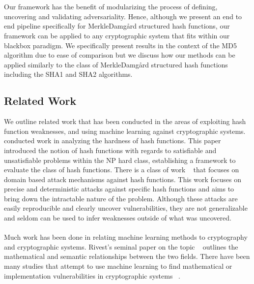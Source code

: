 \documentclass[letterpaper,twocolumn,10pt]{article}
\begin{document}
\\
\\
Our framework has the benefit of modularizing the process of defining, uncovering and validating adversariality. Hence, although we present an end to end pipeline specifically for Merkle{\textendash}Damg\r{a}rd structured hash functions, our framework can be applied to any cryptographic system that fits within our blackbox paradigm. We specifically present results in the context of the MD5 algorithm due to ease of comparison but we discuss how our methods can be applied similarly to the class of Merkle{\textendash}Damg\r{a}rd structured hash functions including the SHA1 and SHA2 algorithms. 

\subsection{Related Work}
We outline related work that has been conducted in the areas of exploiting hash function weaknesses, and using machine learning against cryptographic systems. ~\cite{jovanovic2005logical, rivest1991cryptography} conducted work in analyzing the hardness of hash functions. This paper introduced the notion of hash functions with regards to satisfiable and unsatisfiable problems within the NP hard class, establishing a framework to evaluate the class of hash functions. There is a class of work ~\cite{liang2007improved, stevens2017speeding, stevens2012attacks, de2007collisions, de2006finding,  den1993collisions, stevens2009short} that focuses on domain based attack mechanisms against hash functions. This work focuses on precise and deterministic attacks against specific hash functions and aims to bring down the intractable nature of the problem. Although these attacks are easily reproducible and clearly uncover vulnerabilities, they are not generalizable and seldom can be used to infer weaknesses outside of what was uncovered.
\\
\\
Much work has been done in relating machine learning methods to cryptography and cryptographic systems. Rivest's seminal paper on the topic ~\cite{rivest1991cryptography} outlines the mathematical and semantic relationships between the two fields. There have been many studies that attempt to use machine learning to find mathematical or implementation vulnerabilities in cryptographic systems ~\cite{hospodar2011machine, graepel2012ml}. 
\end{document}
